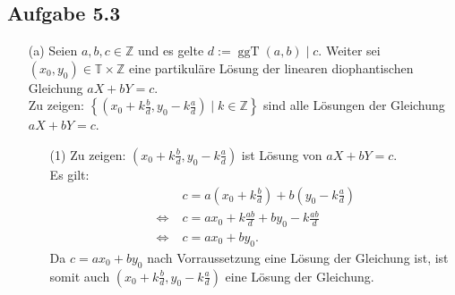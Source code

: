 \documentclass[12pt]{article}
\newcommand{\gdw}{\;\Longleftrightarrow\;}
\newcommand{\ggT}{\operatorname{ggT}}
\begin{document}
\subsection*{Aufgabe 5.3}
\begin{enumerate}
	\item[(a)] Seien $a,b,c\in\mathbb{Z}$ und es gelte $d:=\ggT(a,b)\mid c$. Weiter sei$(x_0,y_0)\in\mathbb{T}\times\mathbb{Z}$ eine partikuläre Lösung der linearen diophantischen Gleichung $aX+bY=c$. \\
	Zu zeigen: $\left\{(x_0+k\frac{b}{d},y_0-k\frac{a}{d})\mid k\in\mathbb{Z}\right\}$ sind alle Lösungen der Gleichung $aX+bY=c$. \\
	\begin{enumerate}
		\item[(1)] Zu zeigen: $(x_0+k\frac{b}{d},y_0-k\frac{a}{d})$ ist Lösung von $aX+bY=c$. \\
		Es gilt:
		\begin{align*}
			&c=a\left(x_0+k\frac{b}{d}\right)+b\left(y_0-k\frac{a}{d}\right) \\
			\gdw &c=ax_0+k\frac{ab}{d}+by_0-k\frac{ab}{d} \\
			\gdw &c=ax_0+by_0.
		\end{align*}
		Da $c=ax_0+by_0$ nach Vorraussetzung eine Lösung der Gleichung ist, ist somit auch $(x_0+k\frac{b}{d},y_0-k\frac{a}{d})$ eine Lösung der Gleichung. \\
		

\end{enumerate}
\end{enumerate}
\end{document}
